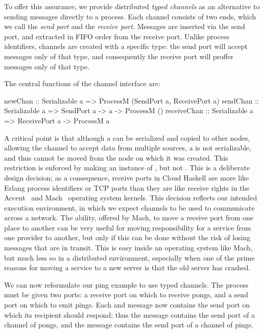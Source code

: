 \documentclass[preprint]{sigplanconf}
\begin{document}
To offer this assurance, we provide distributed {\em typed channels} as an alternative to sending messages directly to a process. Each channel consists of two ends, which we call the {\em send port} and the {\em receive port}. Messages are inserted via the send port, and extracted in FIFO order from the receive port. Unlike process identifiers, channels are created with a specific type: the send port will accept messages only of that type, and consequently the receive port will proffer messages only of that type.

The central functions of the channel interface are:
\par{\small
\begin{code}
newChan  :: Serializable a 
         => ProcessM (SendPort a, ReceivePort a)
sendChan :: Serializable a => SendPort a -> a -> ProcessM ()
receiveChan :: Serializable a => ReceivePort a -> ProcessM a
\end{code}}

A critical point is that although a  can be serialized and copied to other nodes, allowing the channel to accept data from multiple sources, a  is not serializable, and thus cannot be moved from the node on which it was created.
This restriction is enforced by making  an instance of , but not . 
This is a deliberate design decision; as a consequence, receive ports in Cloud Haskell are more like Erlang process identifiers or TCP ports than they are like receive rights in the Accent~\cite{Rashid81} and Mach~\cite[\S4.2.3]{free-s2008} operating system kernels.   
This decision reflects our intended execution environment, in which we expect channels to be used to communicate across a network.  
The ability, offered by Mach, to move a receive port from one place to another can be very useful for moving responsibility for a service from one provider to another, but only if this can be done without the risk of losing messages that are in transit.  
This is easy inside an operating system like Mach, but much less so in a distributed environment, especially when one of the prime reasons for moving a service to a new server is that the old server has crashed.  

We can now reformulate our ping example to use typed channels. The  process must be given two ports: a receive port on which to receive pongs, and a send port on which to emit pings. Each  and  message now contains the send port on which its recipient should respond; thus the  message contains the send port of a channel of pongs, and the  message contains the send port of a channel of pings.
\end{document}

